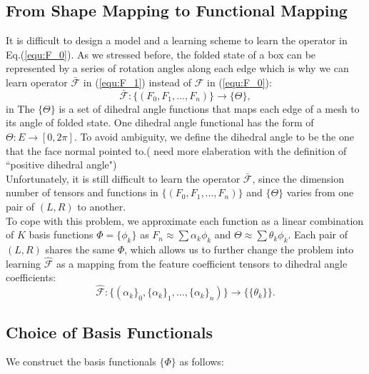 \subsection{From Shape Mapping to Functional Mapping}
It is difficult to design a model and a learning scheme to learn the operator in Eq.(\ref{equ:F_0}). As we stressed before, the folded state of a box can be represented by a series of rotation angles along each edge which is why we can learn operator $\mathcal{\bar{F}}$ in (\ref{equ:F_1}) instead of $\mathcal{F}$ in (\ref{equ:F_0}):
\begin{equation}
\mathcal{\bar{F}}:\{(\mathit{F}_0,\mathit{F}_1,...,\mathit{F}_n)\}\rightarrow\{\Theta\},
\label{equ:F_1}
\end{equation}
in {} The $\{\Theta\}$ is a set of dihedral angle functions that maps each edge of a mesh to its angle of folded state. One dihedral angle functional has the form of $\Theta:E\rightarrow [0,2\pi]$. To avoid ambiguity, we define the dihedral angle to be the one that the face normal pointed to.({\color{red} {need more elaberation with the definition of ``positive dihedral angle"}})\\
Unfortunately, it is still difficult to learn the operator $\mathcal{\bar{F}}$, since the dimension number of tensors and functions in $\{(\mathit{F}_0,\mathit{F}_1,...,\mathit{F}_n)\}$ and $\{\Theta\}$ varies from one pair of $(L,R)$ to another.\\
To cope with this problem, we approximate each function as a linear combination of $K$ basis functions $\Phi = \{\phi_k\}$ as $\mathit{F}_n \approx \sum \alpha_k \phi_k$  and $\Theta \approx \sum \theta_k \phi_k$. Each pair of $(L,R)$ shares the same $\Phi$, which allows us to further change the problem into learning $\mathcal{\hat{F}}$ as a mapping from the feature coefficient tensors to dihedral angle coefficients:
\begin{equation}
\mathcal{\hat{F}}:\{(\alpha_k\}_0,\{\alpha_k\}_1,...,\{\alpha_k\}_n)\}\rightarrow\{\{\theta_k\}\}.
\label{equ:F_2}
\end{equation}
\subsection{Choice of Basis Functionals}
We construct the basis functionals $\{\Phi\}$ as follows:\\
